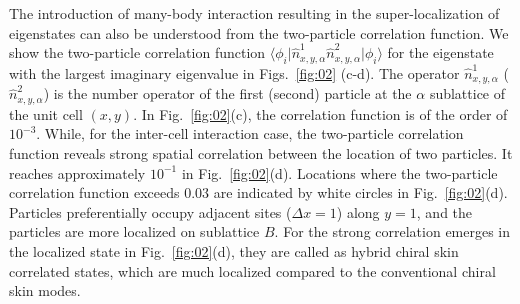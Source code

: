\documentclass[longbibliography, aps, prx, amsmath, amssymb, amsfonts, twocolumn,superscriptaddress, footinbib]{revtex4-1}
\begin{document}
	
	The introduction of many-body interaction resulting in the super-localization of eigenstates can also be understood from the two-particle correlation function. 
	We show the two-particle correlation function $\langle \phi_i \vert \hat{n}^1_{x,y,\alpha} \hat{n}^2_{x,y,\alpha} \vert \phi_i \rangle$ for the eigenstate with the largest imaginary eigenvalue in Figs.~\ref{fig:02} (c-d). The operator $\hat{n}^1_{x,y,\alpha}$ ($\hat{n}^2_{x,y,\alpha}$) is the number operator of the first (second) particle at the $\alpha$ sublattice of the unit cell $(x,y)$.
	In Fig.~\ref{fig:02}(c), the correlation function is of the order of $10^{-3}$. While, for the inter-cell interaction case, the two-particle correlation function reveals strong spatial correlation between the location of two particles. It reaches approximately $10^{-1}$ in Fig.~\ref{fig:02}(d). Locations where the two-particle correlation function exceeds $0.03$ are indicated by white circles in Fig.~\ref{fig:02}(d).
	Particles preferentially occupy adjacent sites ($\Delta x =1$) along $y=1$, and the particles are more localized on sublattice $B$. 
	For the strong correlation emerges in the localized state in Fig.~\ref{fig:02}(d), they are called as hybrid chiral skin correlated states, which are much localized compared to the conventional chiral skin modes.
\end{document}

